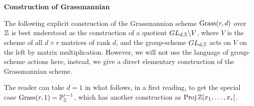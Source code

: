 \medskip


\bigskip

\centerline{\large\bf Construction of Grassmannian}


\medskip

The following explicit construction of
the Grassmannian scheme $\operatorname{Grass}(r,d)$ over $\mathbb{Z}$ is best understood
as the construction of a quotient
$GL_{d,\mathbb{Z}}\backslash V$, where $V$ is the scheme of all
$d\times r$ matrices of rank $d$, and the group-scheme
$GL_{d,\mathbb{Z}}$ acts on $V$ on the left by matrix multiplication. However,
we will not use the language of group-scheme actions
here, instead, we give a direct elementary construction of
the Grassmannian scheme.

The reader can take $d=1$ in what follows, in a first reading, to
get the special case $\operatorname{Grass}(r,1) = \mathbb{P}^{r-1}_{\mathbb{Z}}$, which
has another construction as $\operatorname{Proj} \mathbb{Z}[x_1,\ldots,x_r]$.



\medskip



